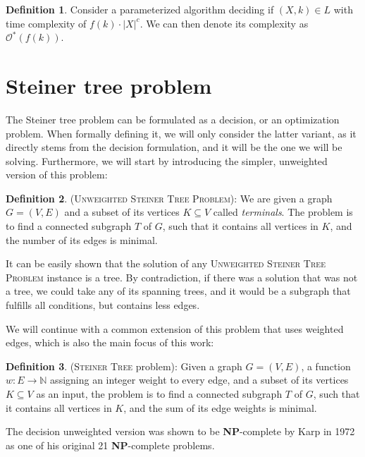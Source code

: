 \documentclass[thesis=M,english,hidelinks]{FITthesis}[2012/10/20]
\theoremstyle{definition}
\newtheorem{definition}{Definition}
\newcommand{\NPC}{\textbf{NP}-complete\xspace}
\begin{document}
\begin{definition}
    Consider a parameterized algorithm deciding if $(X, k) \in L$ with time complexity of $f(k) \cdot \lvert X
    \rvert^c$. We can then denote its complexity as $\mathcal{O}^*(f(k))$.
\end{definition}

\section{Steiner tree problem}

The Steiner tree problem can be formulated as a decision, or an optimization problem. When formally defining it, we will
only consider the latter variant, as it directly stems from the decision formulation, and it will be the one we will be
solving. Furthermore, we will start by introducing the simpler, unweighted version of this problem:

\begin{definition}
    (\textsc{Unweighted Steiner Tree Problem}): We are given a graph $G = (V, E)$ and a subset of its vertices $K
    \subseteq V$ called \emph{terminals}. The problem is to find a connected subgraph $T$ of $G$, such that it contains
    all vertices in $K$, and the number of its edges is minimal.
\end{definition}

It can be easily shown that the solution of any \textsc{Unweighted Steiner Tree Problem} instance is a tree. By
contradiction, if there was a solution that was not a tree, we could take any of its spanning trees, and it would be a
subgraph that fulfills all conditions, but contains less edges.

We will continue with a common extension of this problem that uses weighted edges, which is also the main focus of this
work:

\begin{definition}
    (\textsc{Steiner Tree} problem): Given a graph $G = (V, E)$, a function $w: E \rightarrow \mathbb{N}$ assigning
    an integer weight to every edge, and a subset of its vertices $K \subseteq V$
    as an input, the problem is to find a connected subgraph $T$ of $G$, such that it contains all vertices in $K$, and
    the sum of its edge weights is minimal.
\end{definition}

The decision unweighted version was shown to be \NPC by Karp in 1972 \cite{Karp1972} as one of his original 21 \NPC problems.
\end{document}
